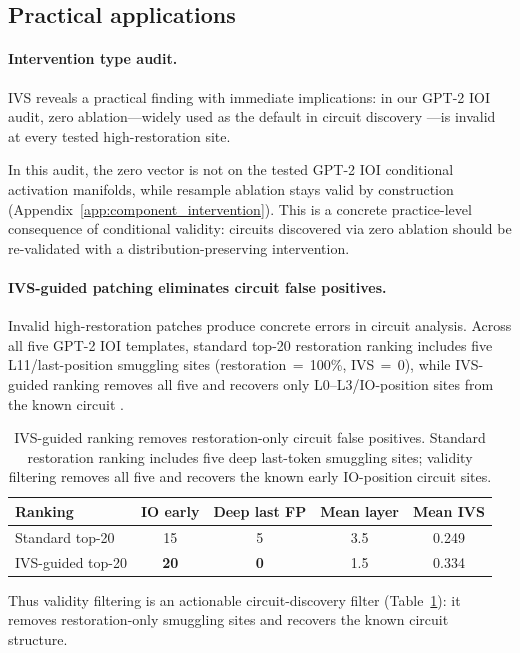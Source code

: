 \documentclass{article}
\begin{document}
\subsection{Practical applications}

\paragraph{Intervention type audit.}
IVS reveals a practical finding with immediate implications: in our GPT-2 IOI audit, zero ablation---widely used as the default in circuit discovery \citep{conmy2023automated}---is invalid at every tested high-restoration site.

In this audit, the zero vector is not on the tested GPT-2 IOI conditional activation manifolds, while resample ablation stays valid by construction (Appendix~\ref{app:component_intervention}). This is a concrete practice-level consequence of conditional validity: circuits discovered via zero ablation should be re-validated with a distribution-preserving intervention.

\paragraph{IVS-guided patching eliminates circuit false positives.}
Invalid high-restoration patches produce concrete errors in circuit analysis. Across all five GPT-2 IOI templates, standard top-20 restoration ranking includes five L11/last-position smuggling sites (restoration\,$=$\,100\%, IVS\,$=$\,0), while IVS-guided ranking removes all five and recovers only L0--L3/IO-position sites from the known circuit \citep{wang2022interpretability}.

\begin{table}[h]
\caption{IVS-guided ranking removes restoration-only circuit false positives. Standard restoration ranking includes five deep last-token smuggling sites; validity filtering removes all five and recovers the known early IO-position circuit sites.}
\label{tab:ivs_guided_patching}
\vspace{-2mm}
\begin{center}
\small
\setlength{\tabcolsep}{5pt}
\begin{tabular}{lcccc}
\toprule
\textbf{Ranking} & \textbf{IO early} & \textbf{Deep last FP} & \textbf{Mean layer} & \textbf{Mean IVS} \\
\midrule
Standard top-20 & 15 & 5 & 3.5 & 0.249 \\
IVS-guided top-20 & \textbf{20} & \textbf{0} & 1.5 & 0.334 \\
\bottomrule
\end{tabular}
\end{center}
\vspace{-4mm}
\end{table}
Thus validity filtering is an actionable circuit-discovery filter (Table~\ref{tab:ivs_guided_patching}): it removes restoration-only smuggling sites and recovers the known circuit structure.
\end{document}
